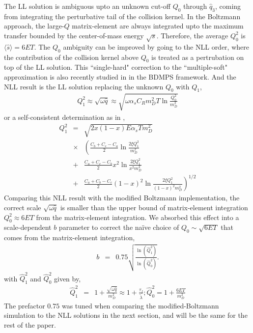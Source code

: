 \documentclass[aps, prc, reprint, amsmath, groupedaddress, nofootinbib]{revtex4-1}
\begin{document}
The LL solution is ambiguous upto an unknown cut-off $Q_0$  through $\hat{q}_3$, coming from integrating the perturbative tail of the collision kernel.
In the Boltzmann approach, the large-$Q$ matrix-element are always integrated upto the maximum transfer bounded by the center-of-mass energy $\sqrt{s}$. Therefore, the average $Q_0^2$ is $\langle\hat{s}\rangle = 6ET$.
The $Q_0$ ambiguity can be improved by going to the NLL order, where the contribution of the collision kernel above $Q_0$ is treated as a pertrubation on top of the LL solution.
This ``single-hard" correction to the ``multiple-soft" approximation is also recently studied in \cite{Mehtar-Tani:2019tvy} in the BDMPS framework.
And the NLL result is the LL solution replacing the unknown $Q_0$ with $Q_1$,
\begin{eqnarray}
Q_1^2  \approx \sqrt{\omega \hat{q}} \approx \sqrt{\omega \alpha_s C_R m_D^2 T \ln\frac{Q_0^2}{m_D^2}}
\label{eq:Q1}
\end{eqnarray}
or a self-consistent determination as in \cite{Arnold:2008zu},
\begin{eqnarray}
Q_1^2 &=& \sqrt{2 x (1-x) E \alpha_s T m_D^2}\\\nonumber
&\times & \left(
\frac{C_b+C_c-C_a}{2}\ln\frac{2\xi Q_1^2}{m_D^2} \right.\\\nonumber 
&+& \frac{C_a+C_c-C_b}{2} x^2 \ln\frac{2\xi Q_1^2}{x^2 m_D^2} \\\nonumber 
&+& \left.\frac{C_a+C_b-C_c}{2} (1-x)^2 \ln\frac{2\xi Q_1^2}{(1-x)^2 m_D^2} \right)^{1/2}
\label{eq:Q1-sf}
\end{eqnarray}
Comparing this NLL result with the modified Boltzmann implementation, the correct scale $\sqrt{\omega \hat{q}}$ is smaller than the upper bound of matrix-element integration $Q_0^2 \approx 6ET$ from the matrix-element integration.
We absorbed this effect into a scale-dependent $b$ parameter to correct the na\"ive choice of $Q_0 \sim \sqrt{6ET}$ that comes from the matrix-element integration,
\begin{eqnarray}
b &=& 0.75\sqrt{\frac{\ln(\hat{Q}_1^2 )}{\ln(\hat{Q}_0^2 )}}.
\label{eq:NLL-b}
\end{eqnarray}
with $\hat{Q}_1^2$ and $\hat{Q}_0^2$ given by,
\begin{eqnarray}
\hat{Q}_1^2 &=& 1 + \frac{\sqrt{\omega\hat{q}}}{m_D^2} \approx 1 + \frac{\tau_f}{\tilde{\lambda}}; 
\hat{Q}_0^2 = 1 + \frac{6ET}{m_D^2}
\end{eqnarray}
The prefactor $0.75$ was tuned when comparing the modified-Boltzmann simulation to the NLL solutions in the next section, and will be the same for the rest of the paper.
\end{document}
